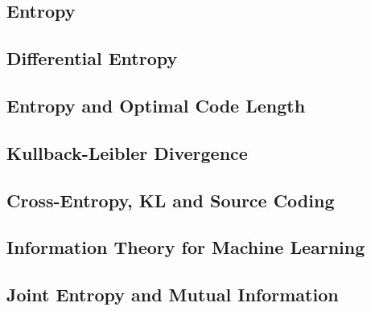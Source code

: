 

\subsection{Entropy}


\subsection{Differential Entropy}


\subsection{Entropy and Optimal Code Length}


\subsection{Kullback-Leibler Divergence}


\subsection{Cross-Entropy, KL and Source Coding}


\subsection{Information Theory for Machine Learning}


\subsection{Joint Entropy and Mutual Information}



